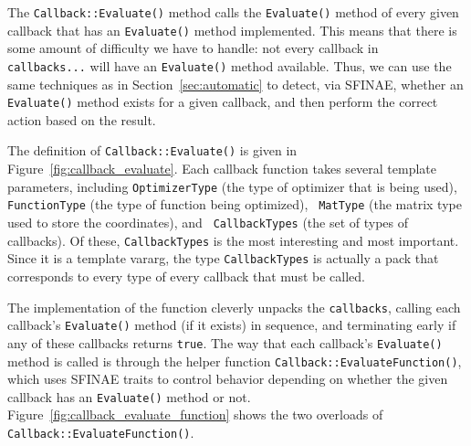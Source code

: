 The {\tt Callback::Evaluate()} method calls the {\tt Evaluate()} method of every
given callback that has an {\tt Evaluate()} method implemented.  This means that
there is some amount of difficulty we have to handle: not every callback in {\tt
callbacks...} will have an {\tt Evaluate()} method available.  Thus, we can use
the same techniques as in Section~\ref{sec:automatic} to detect, via SFINAE,
whether an {\tt Evaluate()} method exists for a given callback, and then perform
the correct action based on the result.

The definition of {\tt Callback::Evaluate()} is given in
Figure~\ref{fig:callback_evaluate}.  Each callback function takes several
template parameters, including {\tt OptimizerType} (the type of optimizer that
is being used), {\tt FunctionType} (the type of function being optimized), {\tt
MatType} (the matrix type used to store the coordinates), and {\tt
CallbackTypes} (the set of types of callbacks).  Of these, {\tt CallbackTypes}
is the most interesting and most important.  Since it is a template vararg, the
type {\tt CallbackTypes} is actually a pack that corresponds to every type of
every callback that must be called.

The implementation of the function cleverly unpacks the {\tt callbacks}, calling
each callback's {\tt Evaluate()} method (if it exists) in sequence, and
terminating early if any of these callbacks returns {\tt true}.  The way that
each callback's {\tt Evaluate()} method is called is through the helper function
{\tt Callback::EvaluateFunction()}, which uses SFINAE traits to control behavior
depending on whether the given callback has an {\tt Evaluate()} method or not.
Figure~\ref{fig:callback_evaluate_function} shows the two overloads of {\tt
Callback::EvaluateFunction()}.


